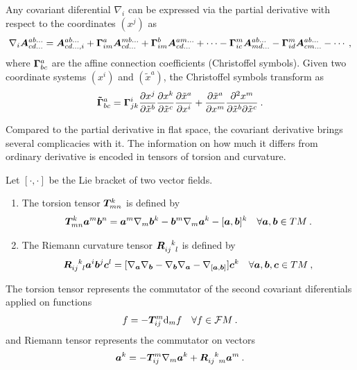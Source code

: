Any covariant diferential $\nabla_i$ can be expressed via the partial derivative with respect to the coordinates $(x^j)$ as
\begin{align}
    \nabla_i \boldsymbol{A}^{ab \dots}_{cd \dots} = \boldsymbol{A}^{ab \dots}_{cd \dots, i} + \boldsymbol{\Gamma}^{a}_{im} \boldsymbol{A}^{mb \dots}_{cd \dots} + \boldsymbol{\Gamma}^{b}_{im} \boldsymbol{A}^{am \dots}_{cd \dots} + \cdots
    - \boldsymbol{\Gamma}^{m}_{ic} \boldsymbol{A}^{ab \dots}_{md \dots} - \boldsymbol{\Gamma}^{m}_{id} \boldsymbol{A}^{ab \dots}_{cm \dots} - \cdots \:,
\end{align}
where $\boldsymbol{\Gamma}^{a}_{bc}$ are the affine connection coefficients (Christoffel symbols). Given two coordinate systems $(x^i)$ and $(\tilde x^a)$, the Christoffel symbols transform as
\begin{align}
    \boldsymbol{\tilde\Gamma}^{a}_{bc} = \boldsymbol{\Gamma}^i_{jk} \frac{\partial x^j}{\partial \tilde  x^b} \frac{\partial x^k}{\partial \tilde x^c}  \frac{\partial \tilde x^a}{\partial x^i} + \frac{\partial \tilde x^a}{\partial x^m} \frac{\partial^2 x^m}{\partial \tilde x^b \partial \tilde x^c} \:.
\end{align}

Compared to the partial derivative in flat space, the covariant derivative brings several complicacies with it. The information on how much it differs from ordinary derivative is encoded in tensors of torsion and curvature. 

\begin{definition}
    Let $[\cdot,\cdot]$ be the Lie bracket of two vector fields.

    \begin{enumerate}
        \item The torsion tensor $\boldsymbol{T}^{k}_{mn}$ is defined by
        \begin{align}
            \boldsymbol{T}^k_{mn} \boldsymbol{a}^m \boldsymbol{b}^n = \boldsymbol{a}^m \nabla_m \boldsymbol{b}^k - \boldsymbol{b}^m \nabla_m \boldsymbol{a}^k - [\boldsymbol{a}, \boldsymbol{b}]^k \quad \forall \boldsymbol{a}, \boldsymbol{b} \in TM \:.
        \end{align}
        \item The Riemann curvature tensor $\vc R\indices{_i_j^k_l}$ is defined by
        \begin{align}
            \vc R\indices{_i_j^k_l} \vc a^i \vc b^j \vc c^l = [\nabla_{\vc a} \nabla_{\vc b} - \nabla_{\vc b} \nabla_{\vc a} - \nabla_{[\vc a, \vc b]}] \vc c^k \quad \forall \vc a, \vc b, \vc c \in TM \:,
        \end{align}
    \end{enumerate}
\end{definition}


The torsion tensor represents the commutator of the second covariant diferentials applied on functions
\begin{align}
    [\nabla_i \nabla_j - \nabla_j \nabla_i] f = - \vc T^{m}_{ij} \D_m f \quad \forall f \in \mathcal F M \:.
\end{align}
and Riemann tensor represents the commutator on vectors
\begin{align}
    [\nabla_i \nabla_j - \nabla_j \nabla_i] \vc a^k =  - \vc T_{ij}^m \nabla_m \vc a^k + \vc R\indices{_i_j^k_m} \vc a^m \:. 
\end{align}

